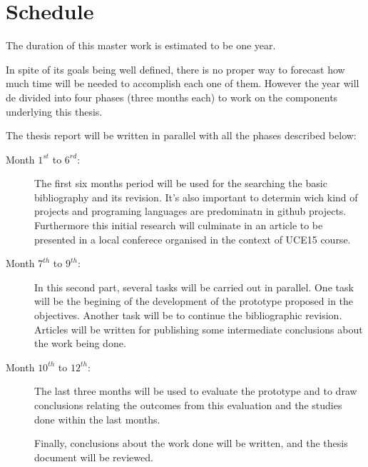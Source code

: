\documentclass[12pt]{article}
\begin{document}
\section{Schedule}

The duration of this master work is estimated to be one year. 

In spite of its goals being well defined, there is no proper way to forecast how much time will be needed to accomplish each one of them. However the year will de divided into four phases (three months each) to work on the components underlying this thesis.

The thesis report will be written in parallel with all the phases described below: 

\begin{description}
\item[Month $1^{st}$ to $6^{rd}$:] The first six months period will be used for the searching the basic bibliography and its revision. It's also important to determin wich kind of projects and programing languages are predominatn in github projects. Furthermore this initial research will culminate in an article to be presented in a local conferece organised in the context of UCE15 course.

\item[Month $7^{th}$ to $9^{th}$:] In this second part, several tasks will be carried out in parallel. One task will be the begining of the development of the prototype proposed in the objectives. Another task will be to continue the bibliographic revision. Articles will be written for publishing some intermediate conclusions about the work being done.

\item[Month $10^{th}$ to $12^{th}$:] The last three months will be used to evaluate the prototype and to draw conclusions relating the outcomes from this evaluation and the studies done within the last months.

Finally, conclusions about the work done will be written, and the thesis document will be reviewed.

\end{description}




{
\small


}
\end{document}
